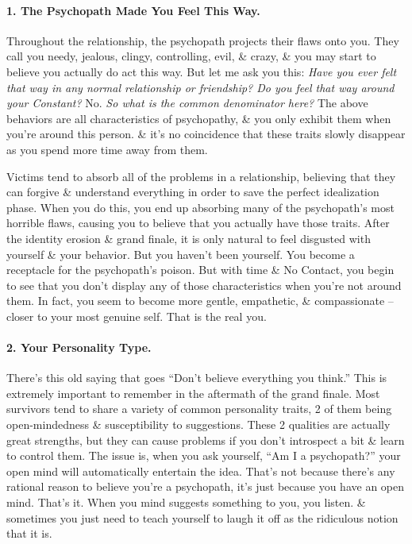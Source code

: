 \documentclass{article}
\numberwithin{equation}{section}
\begin{document}
\paragraph{1. The Psychopath Made You Feel This Way.} Throughout the relationship, the psychopath projects their flaws onto you. They call you needy, jealous, clingy, controlling, evil, \& crazy, \& you may start to believe you actually do act this way. But let me ask you this: \textit{Have you ever felt that way in any normal relationship or friendship? Do you feel that way around your Constant?} No. \textit{So what is the common denominator here?} The above behaviors are all characteristics of psychopathy, \& you only exhibit them when you're around this person. \& it's no coincidence that these traits slowly disappear as you spend more time away from them.

Victims tend to absorb all of the problems in a relationship, believing that they can forgive \& understand everything in order to save the perfect idealization phase. When you do this, you end up absorbing many of the psychopath's most horrible flaws, causing you to believe that you actually have those traits. After the identity erosion \& grand finale, it is only natural to feel disgusted with yourself \& your behavior. But you haven't been yourself. You become a receptacle for the psychopath's poison. But with time \& No Contact, you begin to see that you don't display any of those characteristics when you're not around them. In fact, you seem to become more gentle, empathetic, \& compassionate -- closer to your most genuine self. That is the real you.

\paragraph{2. Your Personality Type.} There's this old saying that goes ``Don't believe everything you think.'' This is extremely important to remember in the aftermath of the grand finale. Most survivors tend to share a variety of common personality traits, 2 of them being open-mindedness \& susceptibility to suggestions. These 2 qualities are actually great strengths, but they can cause problems if you don't introspect a bit \& learn to control them. The issue is, when you ask yourself, ``Am I a psychopath?'' your open mind will automatically entertain the idea. That's not because there's any rational reason to believe you're a psychopath, it's just because you have an open mind. That's it. When you mind suggests something to you, you listen. \& sometimes you just need to teach yourself to laugh it off as the ridiculous notion that it is.
\end{document}
